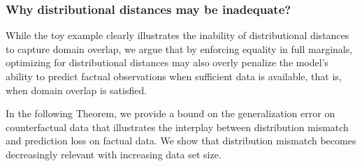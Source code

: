 \documentclass[twoside]{article}
\newcommand{\IPM}{\mathop{\mathrm{IPM}}}
\begin{document}





\subsubsection{Why distributional distances may be inadequate?} 
While the toy example clearly illustrates the inability of distributional distances to capture domain overlap, we argue that by enforcing equality in full marginals, optimizing for distributional distances may also overly penalize the model's ability to predict factual observations when sufficient data is available, that is, when domain overlap is satisfied. 

In the following Theorem, we provide a bound on the generalization error on counterfactual data that illustrates the interplay between distribution mismatch and prediction loss on factual data. We show that distribution mismatch becomes decreasingly relevant with increasing data set size. %
\end{document}
